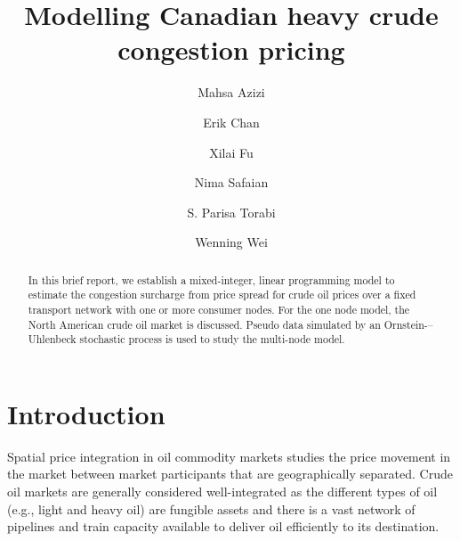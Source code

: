 \documentclass[11pt]{m2pi}
\begin{document}
\title{Modelling Canadian heavy crude congestion pricing}

\author[M. Azizi]{Mahsa Azizi}
\address{University of Saskatchewan, Dept. of Computer Science, Thorvaldson Building, Saskatoon SK, S7N 5C9, Canada}

\author[E. Chan]{Erik Chan}
\address{University of Calgary, Dept. of Math. and Stat.
2500 University Drive NW, Calgary AB, T2N 1N4, Canada}

\author[X. Fu]{Xilai Fu}
\address{University of Alberta, Dept. of Math. and Stat. 11840 90 St NW, Edmonton AB, T5B 3Y6, Canada}

\author[N. Safaian]{Nima Safaian}

\author[S. P. Torabi]{S. Parisa Torabi}
\address{Brock University, Dept. of Physics. 500 Glenridge Avenue, St. Catharines On,  L2S 3A1, Canada}

\author[W. Wei]{Wenning Wei}
\address{University of Calgary, Dept. of Math. and Stat.
2500 University Drive NW, Calgary AB, T2N 1N4, Canada}

\begin{abstract}
In this brief report, we establish a mixed-integer, linear programming model to estimate the congestion surcharge from price spread for crude oil prices over a fixed transport network with one or more consumer nodes. For the one node model, the North American crude oil market is discussed. Pseudo data simulated by an Ornstein-–Uhlenbeck stochastic process is used to study the multi-node model.
\end{abstract}


\maketitle

\section{Introduction}
Spatial price integration in oil commodity markets studies the price movement in the market between market participants that are geographically separated. Crude oil markets are generally considered well-integrated as the different types of oil (e.g., light and heavy oil) are fungible assets and there is a vast network of pipelines and train capacity available to deliver oil efficiently to its destination.
\end{document}
